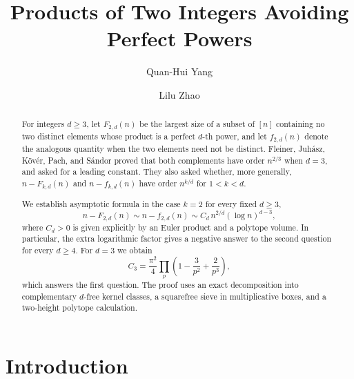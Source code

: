 \documentclass[12pt,a4paper,reqno]{amsart}
\numberwithin{equation}{section}
\newcommand{\1}{\mathbf 1}
\theoremstyle{plain}
\theoremstyle{definition}
\begin{document}
\title[{Products of Two Integers Avoiding Perfect Powers}]{Products of Two Integers Avoiding Perfect Powers}

\author{Quan-Hui Yang}
\address[Quan-Hui Yang]{Ministry of Education Key Laboratory for NSLSCS \\ School of Mathematical Sciences \\ Nanjing Normal University \\ Nanjing 210023 \\ China}
\author{Lilu Zhao}
\address[Lilu Zhao]
{School of Mathematical Sciences, University of Science and Technology of China, Hefei, Anhui, 230026, P.R. China}

 
 
\begin{abstract}
For integers $d\geq 3$, let $F_{2,d}(n)$ be the largest size of a subset
of $[n]$ containing no two distinct elements whose product is a perfect
$d$-th power, and let $f_{2,d}(n)$ denote the analogous quantity when the
two elements need not be distinct. Fleiner, Juh\'asz, K\"ov\'er, Pach,
and S\'andor proved that both complements have order $n^{2/3}$ when
$d=3$, and asked for a leading constant.  They also asked whether, more
generally, $n-F_{k,d}(n)$ and $n-f_{k,d}(n)$ have order $n^{k/d}$ for
$1<k<d$.

We establish asymptotic formula in the case $k=2$ for every fixed $d\geq3$,
\[
 n-F_{2,d}(n)\sim n-f_{2,d}(n)
 \sim C_d\, n^{2/d}(\log n)^{d-3},
\]
where $C_d>0$ is given explicitly by an Euler product and a polytope
volume.  In particular, the extra logarithmic factor gives a negative
answer to the second question for every $d\geq4$.  For $d=3$ we obtain
\[
 C_3=\frac{\pi^2}{4}
 \prod_p\left(1-\frac3{p^2}+\frac2{p^3}\right),
\]
which answers the first question. 
The proof uses an exact decomposition into complementary $d$-free
kernel classes, a squarefree sieve in multiplicative boxes, and a
two-height polytope calculation.
\end{abstract}

 \maketitle

\section{Introduction}
\end{document}
